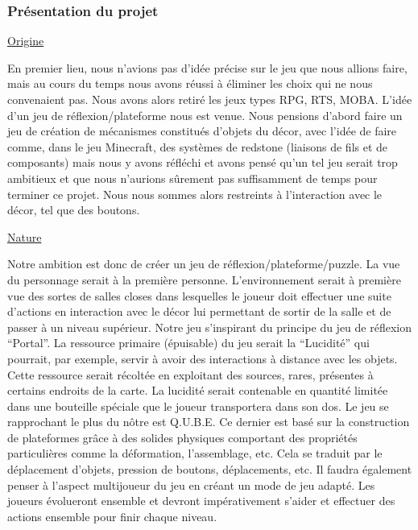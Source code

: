 \documentclass[a4paper , 12pt]{article}
\begin{document}
\newpage

\subsubsection{Présentation du projet}

\quad

\underline{Origine}

\quad

En premier lieu, nous n’avions pas d’idée précise sur le jeu que nous allions faire, mais au cours du temps nous avons réussi à éliminer les choix qui ne nous convenaient pas. Nous avons alors retiré les jeux types RPG, RTS, MOBA. L’idée d’un jeu de réflexion/plateforme nous est venue. Nous pensions d’abord faire un jeu de création de mécanismes constitués d’objets du décor, avec l’idée de faire comme, dans le jeu Minecraft, des systèmes de redstone (liaisons de fils et de composants) mais nous y avons réfléchi et avons pensé qu’un tel jeu serait trop ambitieux et que nous n’aurions sûrement pas suffisamment de temps pour terminer ce projet. Nous nous sommes alors restreints à l’interaction avec le décor, tel que des boutons.

\quad


	\underline{Nature}

\quad

    Notre ambition est donc de créer un jeu de réflexion/plateforme/puzzle. La vue du personnage serait à la première personne. L’environnement serait à première vue des sortes de salles closes dans lesquelles le joueur doit effectuer une suite d’actions en interaction avec le décor lui permettant de sortir de la salle et de passer à un niveau supérieur. Notre jeu s'inspirant du principe du jeu de réflexion “Portal”. La ressource primaire (épuisable) du jeu serait la “Lucidité” qui pourrait, par exemple, servir à avoir des interactions à distance avec les objets. Cette ressource serait récoltée en exploitant des sources, rares, présentes à certains endroits de la carte. La lucidité serait contenable en quantité limitée dans une bouteille spéciale que le joueur transportera dans son dos. Le jeu se rapprochant le plus du nôtre est Q.U.B.E. Ce dernier est basé sur la construction de plateformes grâce à des solides physiques comportant des propriétés particulières comme la déformation, l’assemblage, etc.
Cela se traduit par le déplacement d’objets, pression de boutons, déplacements, etc. Il faudra également penser à l’aspect multijoueur du jeu en créant un mode de jeu adapté. Les joueurs évolueront ensemble et devront impérativement s’aider et effectuer des actions ensemble pour finir chaque niveau.
\end{document}
